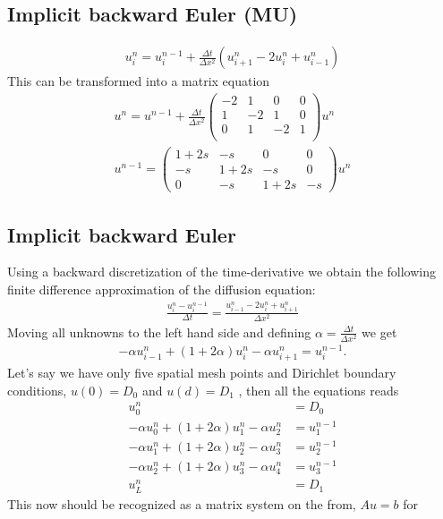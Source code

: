 \documentclass[11pt,a4paper,draft]{article}
\numberwithin{equation}{section}
\begin{document}
\subsection{Implicit backward Euler (MU)}
\begin{gather}
u_i^n = u_i^{n-1} + \frac{\Delta t}{\Delta x^2}\left(
u_{i+1}^n - 2u_i^n + u_{i-1}^n
\right)
\end{gather}
This can be transformed into a matrix equation
\begin{gather}
u^n = u^{n-1} + \frac{\Delta t}{\Delta x^2}
\begin{pmatrix}
-2 & 1 & 0 & 0\\
1 & -2 & 1 & 0\\
0 & 1 & -2 & 1\\
\end{pmatrix}u^n\\
u^{n-1} =
\begin{pmatrix}
1 + 2s & -s & 0 & 0\\
-s & 1 + 2s & -s & 0\\
0 & -s & 1 + 2s & -s
\end{pmatrix}u^n
\end{gather}

\subsection{Implicit backward Euler}

Using a backward discretization of the time-derivative we obtain the following finite difference approximation of the diffusion equation:
\begin{align*}
\frac{u_{i}^{n}-u_{i}^{n-1}}{\Delta t} = \frac{u_{i-1}^{n}-2u_{i}^{n}+u_{i+1}^{n}}{\Delta x^2}
\end{align*}
Moving all unknowns to the left hand side and defining $\alpha = \frac{\Delta t}{\Delta x^2}$ we get
\begin{align*}
-\alpha u_{i-1}^n + (1+2\alpha)u_i^n - \alpha u_{i+1}^n = u_i^{n-1}. 
\end{align*}
Let's say we have only five spatial mesh points and Dirichlet boundary conditions, $u(0)=D_0$ and $u(d)=D_1$ , then all the equations reads
\begin{align*}
u_0^n &= D_0 \\
-\alpha u_{0}^n + (1+2\alpha)u_1^n - \alpha u_{2}^n &= u_1^{n-1} \\
-\alpha u_{1}^n + (1+2\alpha)u_2^n - \alpha u_{3}^n &= u_2^{n-1} \\
-\alpha u_{2}^n + (1+2\alpha)u_3^n - \alpha u_{4}^n &= u_3^{n-1} \\
u_L^n &= D_1 
\end{align*}
This now should be recognized as a matrix system on the from, $Au=b$ for 
\end{document}

